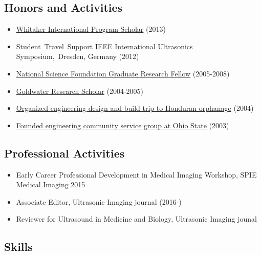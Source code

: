 \documentclass[
]{article}
\providecommand{\tightlist}{%
  \setlength{\itemsep}{0pt}\setlength{\parskip}{0pt}}
\begin{document}
\hypertarget{honors-and-activities}{%
\subsection{Honors and Activities}\label{honors-and-activities}}

\begin{itemize}
\tightlist
\item
  \href{http://www.whitaker.org/grants/fellows-scholars}{Whitaker
  International Program Scholar} (2013)
\item
  Student~Travel~Support IEEE International Ultrasonics
  Symposium,~Dresden, Germany (2012)
\item
  \href{http://www.nsfgrfp.org/}{National Science Foundation Graduate
  Research Fellow} (2005-2008)
\item
  \href{https://goldwater.scholarsapply.org/}{Goldwater Research
  Scholar} (2004-2005)
\item
  \href{http://www.montanadeluz.org/}{Organized engineering design and
  build trip to Honduran orphanage} (2004)
\item
  \href{http://ecos.osu.edu/}{Founded engineering community service
  group at Ohio State} (2003)
\end{itemize}

\hypertarget{professional-activities}{%
\subsection{Professional Activities}\label{professional-activities}}

\begin{itemize}
\tightlist
\item
  Early Career Professional Development in Medical Imaging Workshop,
  SPIE Medical Imaging 2015
\item
  Associate Editor, Ultrasonic Imaging journal (2016-)
\item
  Reviewer for Ultrasound in Medicine and Biology, Ultrasonic Imaging
  jounal
\end{itemize}

\hypertarget{skills}{%
\subsection{Skills}\label{skills}}
\end{document}
